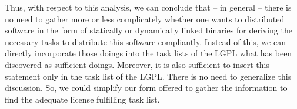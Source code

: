 Thus, with respect to this analysis, we can conclude that -- in general -- there
is no need to gather more or less complicately whether one wants to distributed
software in the form of statically or dynamically linked binaries for deriving
the necessary tasks to distribute this software compliantly. Instead of this, we
can directly incorporate those doings into the task lists of the LGPL what has
been discovered as sufficient doings. Moreover, it is also sufficient to insert
this statement only in the task list of the LGPL. There is no need to generalize
this discussion. So, we could simplify our form offered to gather the
information to find the adequate license fulfilling task list.


%

